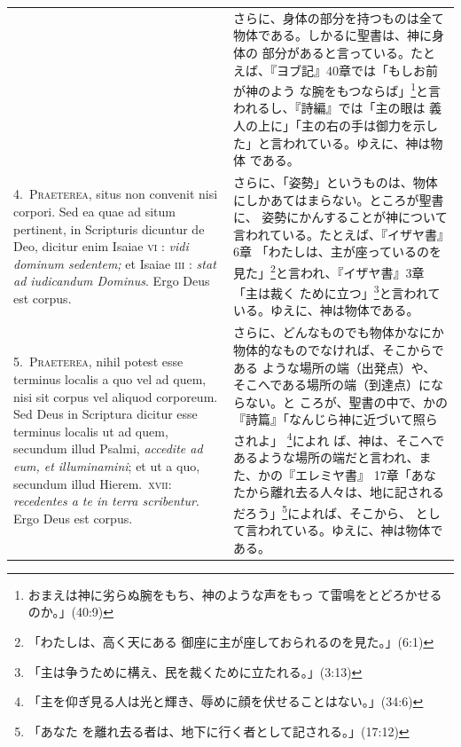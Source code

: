 \documentclass[paper=a4paper,fontsize=10pt,jafontsize=9pt,titlepage]{jlreq}
\begin{document}
\begin{longtable}{p{21em}p{21em}}
&

さらに、身体の部分を持つものは全て物体である。しかるに聖書は、神に身体の
 部分があると言っている。たとえば、『ヨブ記』40章では「もしお前が神のよう
 な腕をもつならば」\footnote{おまえは神に劣らぬ腕をもち、神のような声をもっ
 て雷鳴をとどろかせるのか。」(40:9)}と言われるし、『詩編』では「主の眼は
 義人の上に」「主の右の手は御力を示した」と言われている。ゆえに、神は物体
 である。

\\


4.~{\scshape  Praeterea}, situs non convenit nisi corpori. Sed ea quae ad situm
 pertinent, in Scripturis dicuntur de Deo, dicitur enim Isaiae {\scshape vi} :
 {\itshape vidi dominum sedentem;} et Isaiae {\scshape iii} : {\itshape stat ad
 iudicandum Dominus}. Ergo Deus est corpus.

&

さらに、「姿勢」というものは、物体にしかあてはまらない。ところが聖書に、
 姿勢にかんすることが神について言われている。たとえば、『イザヤ書』6章
 「わたしは、主が座っているのを見た」\footnote{「わたしは、高く天にある
 御座に主が座しておられるのを見た。」(6:1)}と言われ、『イザヤ書』3章「主は裁く
 ために立つ」\footnote{「主は争うために構え、民を裁くために立たれる。」(3:13)}と言われている。ゆえに、神は物体である。

\\


5.~{\scshape Praeterea}, nihil potest esse terminus localis a quo vel ad
 quem, nisi sit corpus vel aliquod corporeum. Sed Deus in Scriptura
 dicitur esse terminus localis ut ad quem, secundum illud Psalmi, {\it
 accedite ad eum, et illuminamini}; et ut a quo, secundum illud
 Hierem.~{\scshape xvii}: {\itshape recedentes a te in terra scribentur}. Ergo
 Deus est corpus. 

 &

さらに、どんなものでも物体かなにか物体的なものでなければ、そこからである
 ような場所の端（出発点）や、そこへである場所の端（到達点）にならない。と
 ころが、聖書の中で、かの『詩篇』「なんじら神に近づいて照らされよ」
 \footnote{「主を仰ぎ見る人は光と輝き、辱めに顔を伏せることはない。」(34:6)}によれ
 ば、神は、そこへであるような場所の端だと言われ、また、かの『エレミヤ書』
 17章「あなたから離れ去る人々は、地に記されるだろう」\footnote{「あなた
 を離れ去る者は、地下に行く者として記される。」(17:12)}によれば、そこから、
 として言われている。ゆえに、神は物体である。

\\




\end{longtable}
\end{document}
